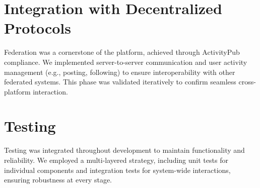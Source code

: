 \section{Integration with Decentralized Protocols}
\label{sec:integration}

Federation was a cornerstone of the platform, achieved through ActivityPub compliance. We implemented server-to-server communication and user activity management (e.g., posting, following) to ensure interoperability with other federated systems. This phase was validated iteratively to confirm seamless cross-platform interaction.

\section{Testing}
\label{sec:testing}

Testing was integrated throughout development to maintain functionality and reliability. We employed a multi-layered strategy, including unit tests for individual components and integration tests for system-wide interactions, ensuring robustness at every stage.

